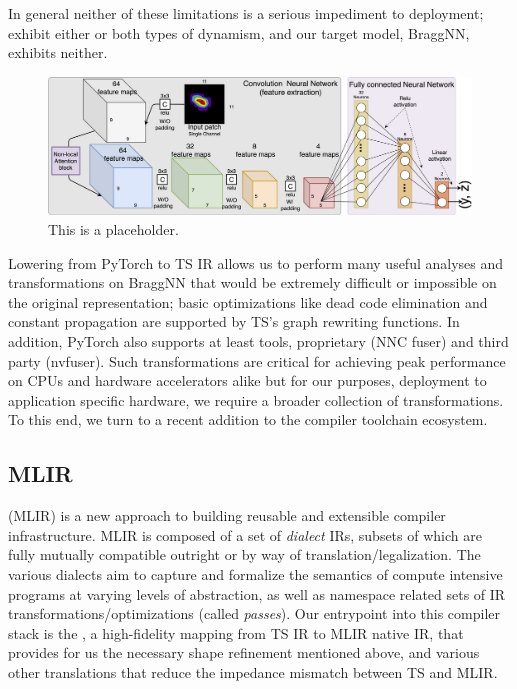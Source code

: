 In general neither of these limitations is a serious impediment to deployment;  exhibit either or both types of dynamism, and our target model, BraggNN, exhibits neither.
\begin{figure}
  \includegraphics[width=\textwidth]{figures/BraggNN}
  \caption{This is a placeholder.}
\end{figure}
Lowering from PyTorch to TS IR allows us to perform many useful analyses and transformations on BraggNN that would be extremely difficult or impossible on the original representation; basic optimizations like dead code elimination and constant propagation are supported by TS's graph rewriting functions.
In addition, PyTorch also supports at least  tools, proprietary (NNC fuser) and third party (nvfuser).
Such transformations are critical for achieving peak performance on CPUs and hardware accelerators alike but for our purposes, deployment to application specific hardware, we require a broader collection of transformations.
To this end, we turn to a recent addition to the compiler toolchain ecosystem.

\subsection{MLIR}\label{subsec:mlir}

 (MLIR) is a new approach to building reusable and extensible compiler infrastructure.
MLIR is composed of a set of \emph{dialect} IRs, subsets of which are fully mutually compatible outright or by way of translation/legalization.
The various dialects aim to capture and formalize the semantics of compute intensive programs at varying levels of abstraction, as well as namespace related sets of IR transformations/optimizations (called \emph{passes}).
Our entrypoint into this compiler stack is the , a high-fidelity mapping from TS IR to MLIR native IR, that provides for us the necessary shape refinement mentioned above, and various other translations that reduce the impedance mismatch between TS and MLIR.

